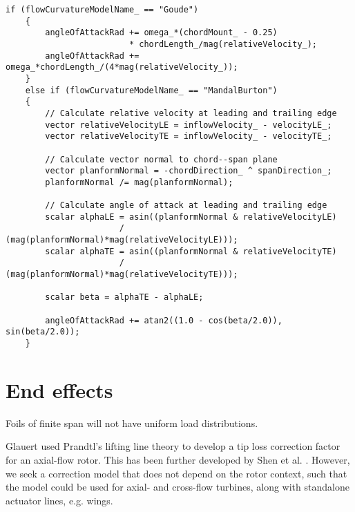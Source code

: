 \begin{lstlisting}[float,caption=Flow curvature model implementation.,label=lst:flow-curvature]
    if (flowCurvatureModelName_ == "Goude")
    {
        angleOfAttackRad += omega_*(chordMount_ - 0.25)
                         * chordLength_/mag(relativeVelocity_);
        angleOfAttackRad += omega_*chordLength_/(4*mag(relativeVelocity_));
    }
    else if (flowCurvatureModelName_ == "MandalBurton")
    {
        // Calculate relative velocity at leading and trailing edge
        vector relativeVelocityLE = inflowVelocity_ - velocityLE_;
        vector relativeVelocityTE = inflowVelocity_ - velocityTE_;
    
        // Calculate vector normal to chord--span plane
        vector planformNormal = -chordDirection_ ^ spanDirection_;
        planformNormal /= mag(planformNormal);
        
        // Calculate angle of attack at leading and trailing edge
        scalar alphaLE = asin((planformNormal & relativeVelocityLE)
                       / (mag(planformNormal)*mag(relativeVelocityLE)));
        scalar alphaTE = asin((planformNormal & relativeVelocityTE)
                       / (mag(planformNormal)*mag(relativeVelocityTE)));
        
        scalar beta = alphaTE - alphaLE;
        
        angleOfAttackRad += atan2((1.0 - cos(beta/2.0)), sin(beta/2.0));
    }
\end{lstlisting}


\section{End effects}

Foils of finite span will not have uniform load distributions.

Glauert used Prandtl's lifting line theory to develop a tip loss correction
factor for an axial-flow rotor. This has been further developed by Shen et al.
\cite{Shen2005a}. However, we seek a correction model that does not depend on
the rotor context, such that the model could be used for axial- and cross-flow
turbines, along with standalone actuator lines, e.g. wings.

